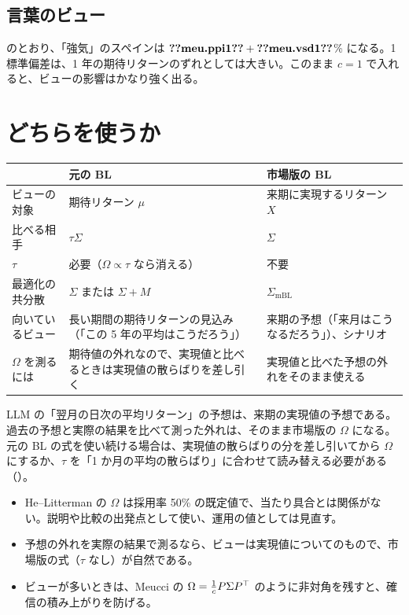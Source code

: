 \subsection*{言葉のビュー}

\begin{table}[htbp]
\centering
\caption{Meucci の式~\eqref{eq:meucci-eta} で、言葉のビューを数字に直したもの（年率 \%、$\alpha=1$、$\beta=2$）。}
\label{tab:meucci-eta}
\end{table}

 のとおり、「強気」のスペインは $\V{meu.ppi1}+\V{meu.vsd1}$\% になる。1 標準偏差は、1 年の期待リターンのずれとしては大きい。このまま $c=1$ で入れると、ビューの影響はかなり強く出る。

\section{どちらを使うか}

\begin{center}
\small
\begin{tabular}{p{2.6cm}p{5.2cm}p{5.2cm}}
\toprule
 & 元の BL & 市場版の BL \\
\midrule
ビューの対象 & 期待リターン $\mu$ & 来期に実現するリターン $X$ \\
比べる相手 & $\tau\Sigma$ & $\Sigma$ \\
$\tau$ & 必要（$\Omega\propto\tau$ なら消える） & 不要 \\
最適化の共分散 & $\Sigma$ または $\Sigma+M$ & $\Sigma_{\mathrm{mBL}}$ \\
向いているビュー & 長い期間の期待リターンの見込み（「この 5 年の平均はこうだろう」） & 来期の予想（「来月はこうなるだろう」）、シナリオ \\
$\Omega$ を測るには & 期待値の外れなので、実現値と比べるときは実現値の散らばりを差し引く & 実現値と比べた予想の外れをそのまま使える \\
\bottomrule
\end{tabular}
\end{center}

LLM の「翌月の日次の平均リターン」の予想は、来期の実現値の予想である。過去の予想と実際の結果を比べて測った外れは、そのまま市場版の $\Omega$ になる。元の BL の式を使い続ける場合は、実現値の散らばりの分を差し引いてから $\Omega$ にするか、$\tau$ を「1 か月の平均の散らばり」に合わせて読み替える必要がある（）。

\begin{tipbox}[コツ：比べる相手を意識する]
\begin{itemize}
\item He--Litterman の $\Omega$ は採用率 50\% の既定値で、当たり具合とは関係がない。説明や比較の出発点として使い、運用の値としては見直す。
\item 予想の外れを実際の結果で測るなら、ビューは実現値についてのもので、市場版の式（$\tau$ なし）が自然である。
\item ビューが多いときは、Meucci の $\Omega=\frac1c P\Sigma P^{\top}$ のように非対角を残すと、確信の積み上がりを防げる。
\end{itemize}
\end{tipbox}

